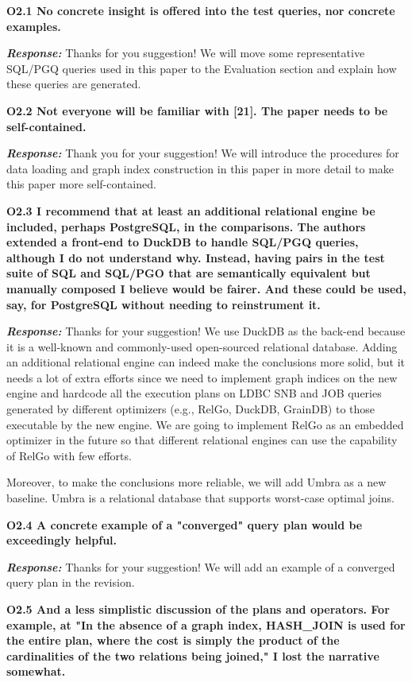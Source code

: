\textbf{O2.1 No concrete insight is offered into the test queries, nor concrete examples. }

\textbf{\textit{Response: }}
Thanks for you suggestion! We will move some representative SQL/PGQ queries used in this paper to the Evaluation section and explain how these queries are generated.


\textbf{
O2.2 Not everyone will be familiar with [21]. The paper needs to be self-contained. }

\textbf{\textit{Response: }}
Thank you for your suggestion! We will introduce the procedures for data loading and graph index construction in this paper in more detail to make this paper more self-contained.

\textbf{ 
O2.3 I recommend that at least an additional relational engine be included, perhaps PostgreSQL, in the comparisons. The authors extended a front-end to DuckDB to handle SQL/PGQ queries, although I do not understand why. Instead, having pairs in the test suite of SQL and SQL/PGO that are semantically equivalent but manually composed I believe would be fairer. And these could be used, say, for PostgreSQL without needing to reinstrument it.}

\textbf{\textit{Response: }}
Thanks for your suggestion! 
We use DuckDB as the back-end because it is a well-known and commonly-used open-sourced relational database.
Adding an additional relational engine can indeed make the conclusions more solid, but it needs a lot of extra efforts since we need to implement graph indices on the new engine and hardcode all the execution plans on LDBC SNB and JOB queries generated by different optimizers (e.g., RelGo, DuckDB, GrainDB) to those executable by the new engine. We are going to implement RelGo as an embedded optimizer in the future so that different relational engines can use the capability of RelGo with few efforts.

Moreover, to make the conclusions more reliable, we will add Umbra as a new baseline. Umbra is a relational database that supports worst-case optimal joins. 


\textbf{
O2.4 A concrete example of a "converged" query plan would be exceedingly helpful.} 

\textbf{\textit{Response: }} 
Thanks for your suggestion! We will add an example of a converged query plan in the revision.


\textbf{
O2.5 And a less simplistic discussion of the plans and operators. For example, at "In the absence of a graph index, HASH\_JOIN is used for the entire plan, where the cost is simply the product of the cardinalities of the two relations being joined," I lost the narrative somewhat. }

